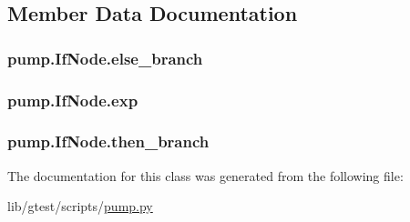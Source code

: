 \subsection{Member Data Documentation}
\hypertarget{classpump_1_1_if_node_a12e422b16ed4291f15cd95cd6e7f81eb}{
\subsubsection[{else\-\_\-branch}]{\setlength{\rightskip}{0pt plus 5cm}pump.\-If\-Node.\-else\-\_\-branch}}\label{classpump_1_1_if_node_a12e422b16ed4291f15cd95cd6e7f81eb}
\hypertarget{classpump_1_1_if_node_a92042e4262196ffd7366350539f512d8}{
\subsubsection[{exp}]{\setlength{\rightskip}{0pt plus 5cm}pump.\-If\-Node.\-exp}}\label{classpump_1_1_if_node_a92042e4262196ffd7366350539f512d8}
\hypertarget{classpump_1_1_if_node_aa9e2e488564629f8dc0d64d165a19ffa}{
\subsubsection[{then\-\_\-branch}]{\setlength{\rightskip}{0pt plus 5cm}pump.\-If\-Node.\-then\-\_\-branch}}\label{classpump_1_1_if_node_aa9e2e488564629f8dc0d64d165a19ffa}


The documentation for this class was generated from the following file\-:\begin{DoxyCompactItemize}
\item 
lib/gtest/scripts/\hyperlink{pump_8py}{pump.\-py}\end{DoxyCompactItemize}
